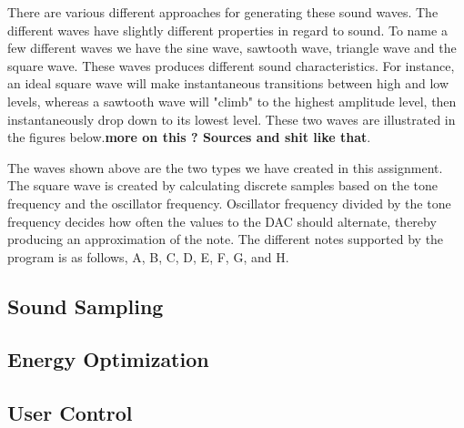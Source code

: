 There are various different approaches for generating these sound waves. The different waves have slightly different properties in regard to sound. To name a few different waves we have the sine wave, sawtooth wave, triangle wave and the square wave. These waves produces different sound characteristics. For instance, an ideal square wave will make instantaneous transitions between high and low levels, whereas a sawtooth wave will "climb" to the highest amplitude level, then instantaneously drop down to its lowest level. These two waves are illustrated in the figures below.{\bf more on this ? Sources and shit like that}. 




The waves shown above are the two types we have created in this assignment. The square wave is created by calculating discrete samples based on the tone frequency and the oscillator frequency. Oscillator frequency divided by the tone frequency decides how often the values to the DAC should alternate, thereby producing an approximation of the note. The different notes supported by the program is as follows, A, B, C, D, E, F, G, and H.


\subsection{Sound Sampling}





\subsection{Energy Optimization}




\subsection{User Control}












